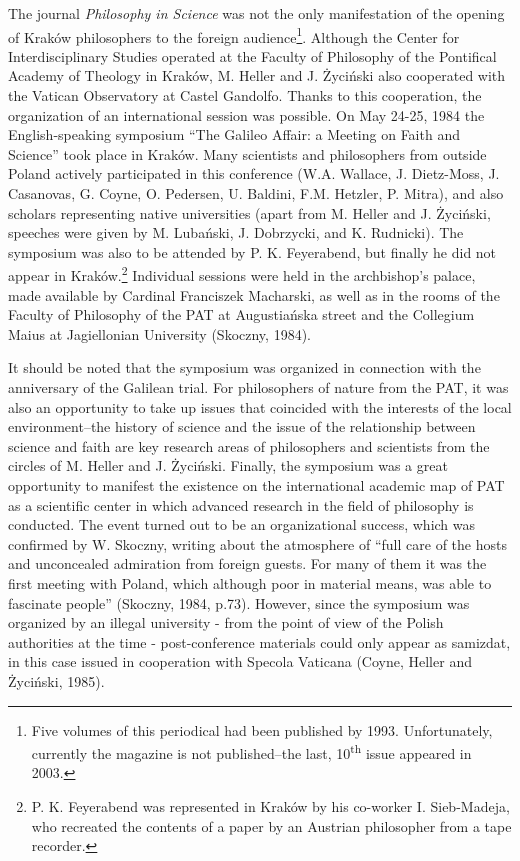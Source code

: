 \documentclass[a4paper]{article}
\begin{document}
The journal \textit{Philosophy in Science} was not the only manifestation of the opening of Kraków philosophers to the
foreign audience\footnote{ Five volumes of this periodical had been published by 1993. Unfortunately, currently the
magazine is not published–the last, 10\textsuperscript{th} issue appeared in 2003.}. Although the Center for
Interdisciplinary Studies operated at the Faculty of Philosophy of the Pontifical Academy of Theology in Kraków, M.
Heller and J. Życiński also cooperated with the Vatican Observatory at Castel Gandolfo. Thanks to this cooperation, the
organization of an international session was possible. On May 24-25, 1984 the English-speaking symposium “The Galileo
Affair: a Meeting on Faith and Science” took place in Kraków. Many scientists and philosophers from outside Poland
actively participated in this conference (W.A. Wallace, J. Dietz-Moss, J. Casanovas, G. Coyne, O. Pedersen, U. Baldini,
F.M. Hetzler, P. Mitra), and also scholars representing native universities (apart from M. Heller and J. Życiński,
speeches were given by M. Lubański, J. Dobrzycki, and K. Rudnicki). The symposium was also to be attended by P. K.
Feyerabend, but finally he did not appear in Kraków.\footnote{ P. K. Feyerabend was represented in Kraków by his
co-worker I. Sieb-Madeja, who recreated the contents of a paper by an Austrian philosopher from a tape recorder.}
Individual sessions were held in the archbishop’s palace, made available by Cardinal Franciszek Macharski, as well as
in the rooms of the Faculty of Philosophy of the PAT at Augustiańska street and the Collegium Maius at Jagiellonian
University \label{ref:RNDOiQxouM3UQ}(Skoczny, 1984).

It should be noted that the symposium was organized in connection with the anniversary of the Galilean trial. For
philosophers of nature from the PAT, it was also an opportunity to take up issues that coincided with the interests of
the local environment–the history of science and the issue of the relationship between science and faith are key
research areas of philosophers and scientists from the circles of M. Heller and J. Życiński. Finally, the symposium was
a great opportunity to manifest the existence on the international academic map of PAT as a scientific center in which
advanced research in the field of philosophy is conducted. The event turned out to be an organizational success, which
was confirmed by W. Skoczny, writing about the atmosphere of “full care of the hosts and unconcealed admiration from
foreign guests. For many of them it was the first meeting with Poland, which although poor in material means, was able
to fascinate people” \label{ref:RNDQCLaBvaoTK}(Skoczny, 1984, p.73). However, since the symposium was organized by an
illegal university - from the point of view of the Polish authorities at the time - post-conference materials could
only appear as samizdat, in this case issued in cooperation with Specola Vaticana \label{ref:RNDwqsqpPrSpR}(Coyne,
Heller and Życiński, 1985).
\end{document}
